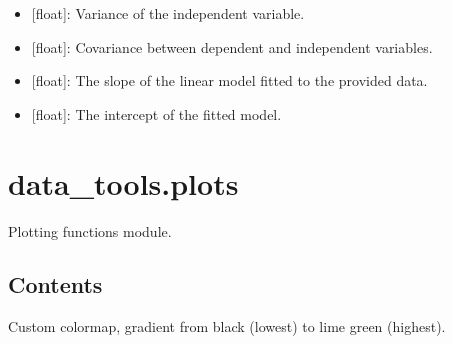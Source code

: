 \documentclass[letterpaper,10pt,english]{sphinxmanual}
\begin{document}
\begin{fulllineitems}
\begin{itemize}
\begin{description}
\begin{itemize}
\item {} 
 {[}float{]}: Variance of the independent variable.

\item {} 
 {[}float{]}: Covariance between dependent and independent
variables.

\item {} 
 {[}float{]}: The slope of the linear model fitted to the
provided data.

\item {} 
 {[}float{]}: The intercept of the fitted model.

\end{itemize}

\end{description}

\end{itemize}

\end{fulllineitems}

\label{\detokenize{plots:module-data_tools.plots}}

\section{data\_tools.plots}
\label{\detokenize{plots:data-tools-plots}}\label{\detokenize{plots::doc}}
Plotting functions module.


\subsection{Contents}
\label{\detokenize{plots:contents}}

\begin{fulllineitems}
\label{\detokenize{plots:data_tools.plots.cmap_bkgr}}
Custom colormap, gradient from black (lowest) to lime green (highest).

\end{fulllineitems}

\end{document}

